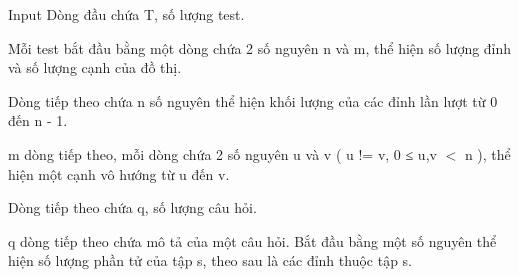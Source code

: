 Input  
Dòng đầu chứa T, số lượng test.  

   Mỗi test bắt đầu bằng một dòng chứa 2 số nguyên n và  m, thể hiện số lượng đỉnh và số lượng cạnh của đồ thị.  

   Dòng tiếp theo chứa n số nguyên thể hiện khối lượng của các đỉnh lần lượt từ 0 đến n - 1.  

   m dòng tiếp theo, mỗi dòng chứa 2 số nguyên u và v ( u != v, 0 ≤ u,v $<$ n ), thể hiện một cạnh vô hướng từ u đến v.  

   Dòng tiếp theo chứa q, số lượng câu hỏi.  

   q dòng tiếp theo chứa mô tả của một câu hỏi. Bắt đầu bằng một số nguyên thể hiện số lượng phần tử của tập s, theo sau là các đỉnh thuộc tập s.